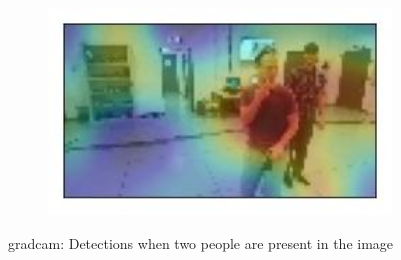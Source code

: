 \begin{figure}[!h]
\begin{center}
\begin{subfigure}[h]{0.24\textwidth}
		\end{subfigure}
		\hfill
		\begin{subfigure}[h]{0.24\textwidth}
			\centering
			\includegraphics[width=1\textwidth]{"contents/images/gradcam/gradcam-double-4"}
		\end{subfigure}
	\end{center}
	\vspace{-0.5cm}
	\caption[\gls{gradcam}: Detections when two people are present in the image]{\gls{gradcam}: Detections when two people are present in the image}
	\label{fig:gradcam-double}
\end{figure}

